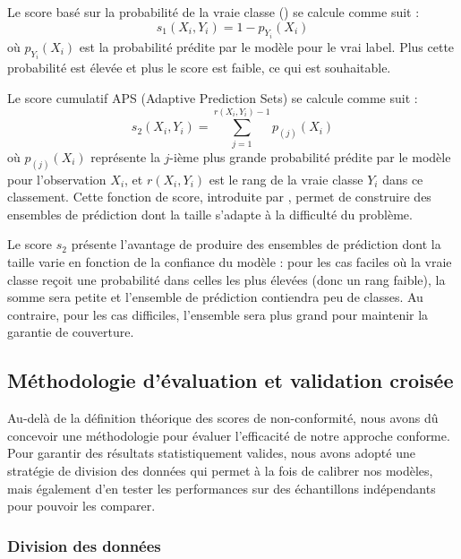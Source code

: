 \documentclass[a4paper,12pt]{article}
\begin{document}
\vspace{0.2cm}

Le score basé sur la probabilité de la vraie classe (\cite{Vovk}) se calcule comme suit : 
$$ s_1(X_i, Y_i) = 1 - p_{Y_i}(X_i) $$ où $p_{Y_i}(X_i)$ est la probabilité prédite par le modèle pour le vrai label. Plus cette probabilité est élevée et plus le score est faible, ce qui est souhaitable.

\vspace{0.2cm}

Le score cumulatif APS (Adaptive Prediction Sets) se calcule comme suit : 
$$ s_2(X_i, Y_i) = \sum_{j=1}^{r(X_i, Y_i)-1} p_{(j)}(X_i) $$ où $p_{(j)}(X_i)$ représente la $j$-ième plus grande probabilité prédite par le modèle pour l'observation $X_i$, et $r(X_i, Y_i)$ est le rang de la vraie classe $Y_i$ dans ce classement. Cette fonction de score, introduite par \cite{Romano}, permet de construire des ensembles de prédiction dont la taille s'adapte à la difficulté du problème.

\vspace{0.2cm}

Le score $s_2$ présente l'avantage de produire des ensembles de prédiction dont la taille varie en fonction de la confiance du modèle : pour les cas faciles où la vraie classe reçoit une probabilité dans celles les plus élevées (donc un rang faible), la somme sera petite et l'ensemble de prédiction contiendra peu de classes. Au contraire, pour les cas difficiles, l'ensemble sera plus grand pour maintenir la garantie de couverture.


\subsection{Méthodologie d'évaluation et validation croisée}

Au-delà de la définition théorique des scores de non-conformité, nous avons dû concevoir une méthodologie pour évaluer l'efficacité de notre approche conforme. Pour garantir des résultats statistiquement valides, nous avons adopté une stratégie de division des données qui permet à la fois de calibrer nos modèles, mais également d'en tester les performances sur des échantillons indépendants pour pouvoir les comparer.

\subsubsection{Division des données}
\end{document}
